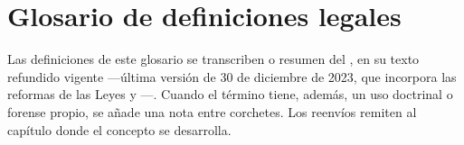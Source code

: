 \chapter{Glosario de definiciones legales}
\label{ap:glosario}

\begin{alerta}
Las definiciones de este glosario se transcriben o resumen del , en su texto refundido vigente ---última versión de 30 de diciembre de 2023, que
incorpora las reformas de las Leyes  y ---. Cuando el término tiene, además,
un uso doctrinal o forense propio, se añade una nota entre corchetes. Los reenvíos remiten al
capítulo donde el concepto se desarrolla.
\end{alerta}

